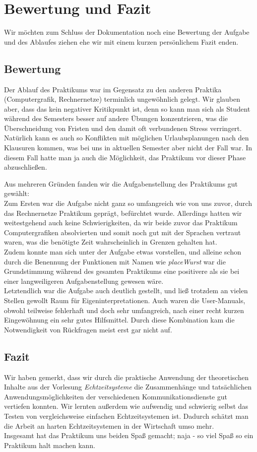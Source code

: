 \chapter{Bewertung und Fazit}

Wir möchten zum Schluss der Dokumentation noch eine Bewertung der Aufgabe und des Ablaufes ziehen ehe wir mit einem kurzen persönlichem Fazit enden.

\section{Bewertung}

Der Ablauf des Praktikums war im Gegensatz zu den anderen Praktika (Computergrafik, Rechnernetze) terminlich ungewöhnlich gelegt. Wir glauben aber, dass das kein negativer Kritikpunkt ist, denn so kann man sich als Student während des Semesters besser auf andere Übungen konzentrieren, was die Überschneidung von Fristen und den damit oft verbundenen Stress verringert. Natürlich kann es auch so Konflikten mit möglichen Urlaubsplanungen nach den Klausuren kommen, was bei uns in aktuellen Semester aber nicht der Fall war. In diesem Fall hatte man ja auch die Möglichkeit, das Praktikum vor dieser Phase abzuschließen.

Aus mehreren Gründen fanden wir die Aufgabenstellung des Praktikums gut gewählt:\\
Zum Ersten war die Aufgabe nicht ganz so umfangreich wie von uns zuvor, durch das Rechnernetze Praktikum geprägt, befürchtet wurde. Allerdings hatten wir weitestgehend auch keine Schwierigkeiten, da wir beide zuvor das Praktikum Computergrafiken absolvierten und somit noch gut mit der Sprachen vertraut waren, was die benötigte Zeit wahrscheinlich in Grenzen gehalten hat.\\
Zudem konnte man sich unter der Aufgabe etwas vorstellen, und alleine schon durch die Benennung der Funktionen mit Namen wie \textit{placeWurst} war die Grundstimmung während des gesamten Praktikums eine positivere als sie bei einer langweiligeren Aufgabenstellung gewesen wäre.\\
Letztendlich war die Aufgabe auch deutlich gestellt, und ließ trotzdem an vielen Stellen gewollt Raum für Eigeninterpretationen. Auch waren die User-Manuals, obwohl teilweise fehlerhaft und doch sehr umfangreich, nach einer recht kurzen Eingewöhnung ein sehr gutes Hilfsmittel. Durch diese Kombination kam die Notwendigkeit von Rückfragen meist erst gar nicht auf.

\section{Fazit}

Wir haben gemerkt, dass wir durch die praktische Anwendung der theoretischen Inhalte aus der Vorlesung \textit{Echtzeitsysteme} die Zusammenhänge und tatsächlichen Anwendungsmöglichkeiten der verschiedenen Kommunikationsdienste gut vertiefen konnten. Wir lernten außerdem wie aufwendig und schwierig selbst das Testen von vergleichsweise einfachen Echtzeitsystemen ist. Dadurch schätzt man die Arbeit an harten Echtzeitsystemen in der Wirtschaft umso mehr.\\
Insgesamt hat das Praktikum uns beiden Spaß gemacht; naja - so viel Spaß so ein Praktikum halt machen kann.